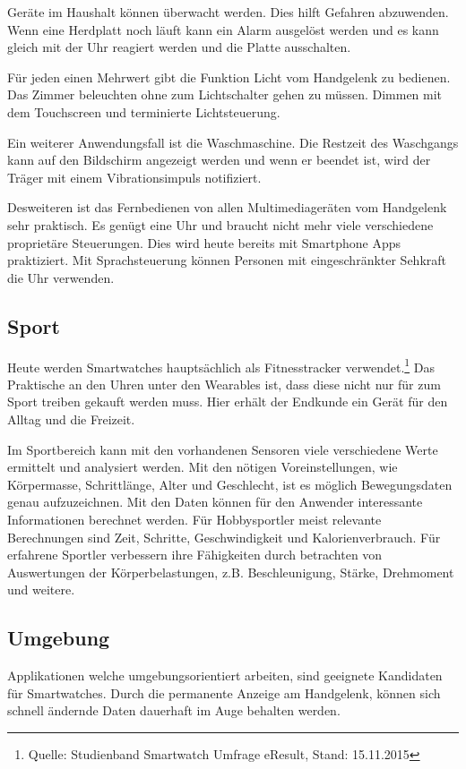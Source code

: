 Geräte im Haushalt können überwacht werden. Dies hilft Gefahren abzuwenden. Wenn eine Herdplatt noch läuft kann ein Alarm ausgelöst werden und es kann gleich mit der Uhr reagiert werden und die Platte ausschalten.

Für jeden einen Mehrwert gibt die Funktion Licht vom Handgelenk zu bedienen. Das Zimmer beleuchten ohne zum Lichtschalter gehen zu müssen. Dimmen mit dem Touchscreen und terminierte Lichtsteuerung.

Ein weiterer Anwendungsfall ist die Waschmaschine. Die Restzeit des Waschgangs kann auf den Bildschirm angezeigt werden und wenn er beendet ist, wird der Träger mit einem Vibrationsimpuls notifiziert.

Desweiteren ist das Fernbedienen von allen Multimediageräten vom Handgelenk sehr praktisch. Es genügt eine Uhr und braucht nicht mehr viele verschiedene proprietäre Steuerungen. Dies wird heute bereits mit Smartphone Apps praktiziert. Mit Sprachsteuerung können Personen mit eingeschränkter Sehkraft die Uhr verwenden.

\subsection{Sport}
Heute werden Smartwatches hauptsächlich als Fitnesstracker verwendet.\footnote{Quelle: Studienband Smartwatch Umfrage eResult, Stand: 15.11.2015} Das Praktische an den Uhren unter den Wearables ist, dass diese nicht nur für zum Sport treiben gekauft werden muss. Hier erhält der Endkunde ein Gerät für den Alltag und die Freizeit.

Im Sportbereich kann mit den vorhandenen Sensoren viele verschiedene Werte ermittelt und analysiert werden. Mit den nötigen Voreinstellungen, wie Körpermasse, Schrittlänge, Alter und Geschlecht, ist es möglich Bewegungsdaten genau aufzuzeichnen. Mit den Daten können für den Anwender interessante Informationen berechnet werden. Für Hobbysportler meist relevante Berechnungen sind Zeit, Schritte, Geschwindigkeit und Kalorienverbrauch. Für erfahrene Sportler verbessern ihre Fähigkeiten durch betrachten von Auswertungen der Körperbelastungen, z.B. Beschleunigung, Stärke, Drehmoment und weitere.

\subsection{Umgebung}
Applikationen welche umgebungsorientiert arbeiten, sind geeignete Kandidaten für Smartwatches. Durch die permanente Anzeige am Handgelenk, können sich schnell ändernde Daten dauerhaft im Auge behalten werden.

